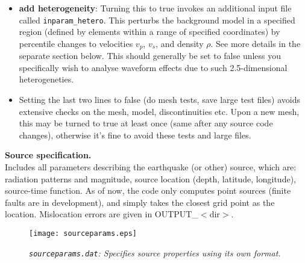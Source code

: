\documentclass[11pt,letter,fleqn,english,notitlepage]{article}
\begin{document}
\begin{itemize}
\item \textbf{add heterogeneity}: Turning this to true invokes an additional input file called {\tt inparam\_hetero}. 
This perturbs the background model in a specified region (defined by elements within a range of specified coordinates) 
by percentile changes to velocities $v_p$, $v_s$, and density $\rho$. See more details in the separate section below. 
This should generally be set to false unless you specifically wish to analyse waveform effects due to such 
2.5-dimensional heterogeneties. 

\item Setting the last two lines to false (do mesh tests, save large test files) 
avoids extensive checks on the mesh, model, discontinuities etc. Upon a new mesh, this may be turned 
to true at least once (same after any source code changes), otherwise it's fine to avoid these tests and large files.
\end{itemize}

\noindent \textbf{Source specification.}\\
Includes all parameters describing the earthquake (or other) source, which are: 
radiation patterns and magnitude, source location (depth, latitude, longitude), source-time function.
As of now, the code only computes point sources (finite faults are in development), 
and simply takes the closest grid point as the location. Mislocation errors are given in OUTPUT\_$<$dir$>$.\\

\begin{figure*}[htb]
\begin{center}
\texttt{[image: sourceparams.eps]}
\caption{\textit{{\tt sourceparams.dat}: Specifies source properties using its own format.}}
\end{center}
\end{figure*}
\end{document}
